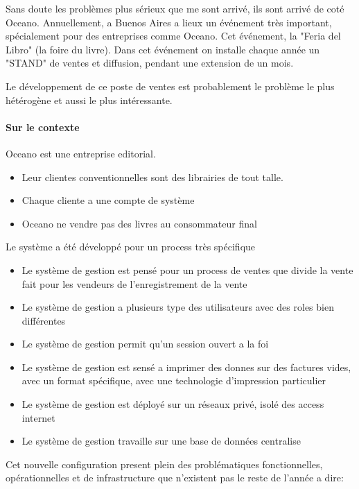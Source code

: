 \documentclass{resume} %
\begin{document}
		Sans doute les problèmes plus sérieux que me sont arrivé, ils sont arrivé de coté Oceano. 
		Annuellement, a Buenos Aires a lieux un événement très important, spécialement pour des entreprises comme Oceano. Cet événement, la "Feria del Libro" (la foire du livre). 
		Dans cet événement on installe chaque année un "STAND" de ventes et diffusion, pendant une extension de un mois. 
		
		Le développement de ce poste de ventes est probablement le problème le plus hétérogène et aussi le plus intéressante. 
		
		\paragraph{ Sur le contexte } 
		
		Oceano est une entreprise editorial. 
		
		\begin {itemize} 
		 \item Leur clientes conventionnelles sont des librairies de tout talle.
		 \item Chaque cliente a une compte de système
		 \item Oceano ne vendre pas des livres au consommateur final
		\end{itemize}
		
		Le système a été développé pour un process très spécifique 
		\begin{itemize} 
		   \item Le système de gestion est pensé pour un process de ventes que divide la vente fait pour les vendeurs de l'enregistrement de la vente
		   \item Le système de gestion a plusieurs type des utilisateurs avec des roles bien différentes
		   \item Le système de gestion permit qu'un session ouvert a la foi 
		   \item Le système de gestion est sensé a imprimer des donnes sur des factures vides, avec un format spécifique, avec une technologie d'impression particulier
		   \item Le système de gestion est déployé sur un réseaux privé, isolé des access internet
		   \item Le système de gestion travaille sur une base de données centralise
		\end{itemize} 
		
		Cet nouvelle configuration present plein des problématiques fonctionnelles, opérationnelles et de infrastructure  que n'existent pas le reste de l'année a dire: 
		
\end{document}

